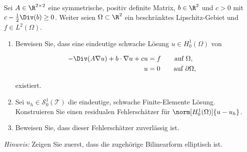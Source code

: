 
\begin{exercise}

Sei $A \in \R^{2 \times 2}$ eine symmetrische, positiv definite Matrix, $b \in \R^2$ und $c > 0$ mit $c - \frac{1}{2}\Div(b) \geq 0$.
Weiter seien $\Omega \subset \R^2$ ein beschränktes Lipschitz-Gebiet und $f \in L^2(\Omega)$.

\begin{enumerate}[label = \textbf{\alph*)}]

  \item Beweisen Sie, dass eine eindeutige schwache Lösung $u \in H_0^1(\Omega)$ von

  \begin{subequations}
    \begin{align}
      -\Div(A\nabla u) + b \cdot \nabla u + cu &= f \qquad \text{auf } \Omega, \label{eq:1A} \\
      u &= 0 \qquad \text{auf } \partial\Omega, \label{eq:1B}
    \end{align}
  \end{subequations}

  existiert.

  \item Sei $u_h \in \mathcal{S}_0^1(\mathcal{T})$ die eindeutige, schwache Finite-Elemente Lösung.
  Konstruieren Sie einen residualen Fehlerschätzer für
  $\norm[H_0^1(\Omega)]{u - u_h}$.

  \item Beweisen Sie, dass dieser Fehlerschätzer zuverlässig ist.

\end{enumerate}

\textit{Hinweis:}
Zeigen Sie zuerst, dass die zugehörige Bilinearform elliptisch ist.

\end{exercise}


